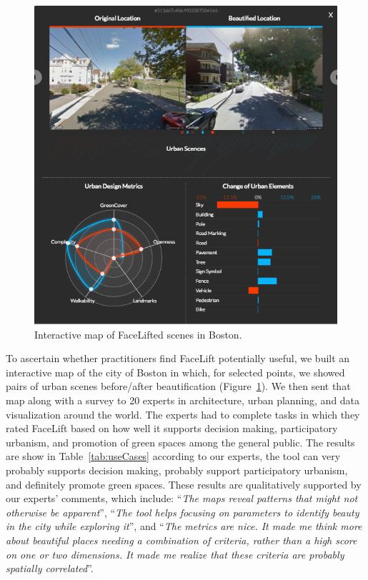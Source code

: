 \begin{figure}[t!]
    \centering
    \includegraphics[width=\columnwidth]{UI.png}
    \caption{Interactive map of FaceLifted scenes in Boston.}
    \label{facelift-UI}
\end{figure}



To ascertain whether practitioners find FaceLift potentially useful, we built an interactive map of the city of Boston in which, for  selected points, we showed pairs of urban scenes before/after beautification (Figure~\ref{facelift-UI}). We then sent that map along with a survey to 20 experts in architecture, urban planning, and data visualization around the world.  The experts had to complete tasks in which they rated FaceLift based on how well it supports decision making, participatory urbanism, and promotion of green spaces among the general public. The results are show in Table~\ref{tab:useCases} according to our experts, the tool can very probably supports decision making, probably support participatory urbanism, and definitely promote green spaces.  These results are  qualitatively supported by our experts' comments, which include: ``\textit{The maps reveal patterns that might not otherwise be apparent}'',  ``\textit{The tool helps focusing on parameters to identify beauty in the city while exploring it}'',  and ``\textit{The metrics are nice. It made me think more about beautiful places needing a combination of criteria, rather than a high score on one or two dimensions. It made me realize that these criteria are probably spatially correlated}''.









